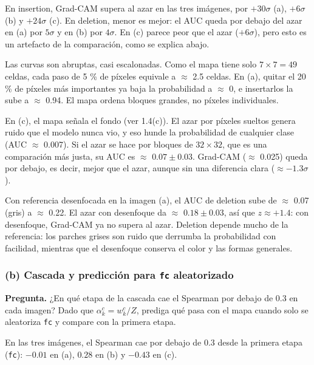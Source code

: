 \documentclass[11pt]{article}
\renewcommand{\_}{\textunderscore\allowbreak{}}
\begin{document}
En insertion, Grad-CAM supera al azar en las tres imágenes, por \(+30\sigma\) (a), \(+6\sigma\) (b) y \(+24\sigma\) (c). En deletion, menor es mejor: el AUC queda por debajo del azar en (a) por \(5\sigma\) y en (b) por \(4\sigma\). En (c) parece peor que el azar (\(+6\sigma\)), pero esto es un artefacto de la comparación, como se explica abajo.

Las curvas son abruptas, casi escalonadas. Como el mapa tiene solo \(7\times7 = 49\) celdas, cada paso de 5 \% de píxeles equivale a \(\approx\) 2.5 celdas. En (a), quitar el 20 \% de píxeles más importantes ya baja la probabilidad a \(\approx\) 0, e insertarlos la sube a \(\approx\) 0.94. El mapa ordena bloques grandes, no píxeles individuales.

En (c), el mapa señala el fondo (ver 1.4(c)). El azar por píxeles sueltos genera ruido que el modelo nunca vio, y eso hunde la probabilidad de cualquier clase (AUC \(\approx\) 0.007). Si el azar se hace por bloques de \(32\times32\), que es una comparación más justa, su AUC es \(\approx\) \(0.07 \pm 0.03\). Grad-CAM (\(\approx\) 0.025) queda por debajo, es decir, mejor que el azar, aunque sin una diferencia clara (\(\approx -1.3\sigma\)).

Con referencia desenfocada en la imagen (a), el AUC de deletion sube de \(\approx\) 0.07 (gris) a \(\approx\) 0.22. El azar con desenfoque da \(\approx\) \(0.18 \pm 0.03\), así que \(z \approx +1.4\): con desenfoque, Grad-CAM ya no supera al azar. Deletion depende mucho de la referencia: los parches grises son ruido que derrumba la probabilidad con facilidad, mientras que el desenfoque conserva el color y las formas generales.

\subsubsection*{(b) Cascada y predicción para \texttt{fc} aleatorizado}
\begin{tcolorbox}[colback=yellow!12, colframe=orange!70!black, boxrule=0.5pt, left=4pt, right=4pt]
\textbf{Pregunta.} ¿En qué etapa de la cascada cae el Spearman por debajo de 0.3 en cada imagen? Dado que \(\alpha_k^c=w_k^c/Z\), prediga qué pasa con el mapa cuando solo se aleatoriza \texttt{fc} y compare con la primera etapa.
\end{tcolorbox}

En las tres imágenes, el Spearman cae por debajo de 0.3 desde la primera etapa (\texttt{fc}): \(-0.01\) en (a), \(0.28\) en (b) y \(-0.43\) en (c).
\end{document}
